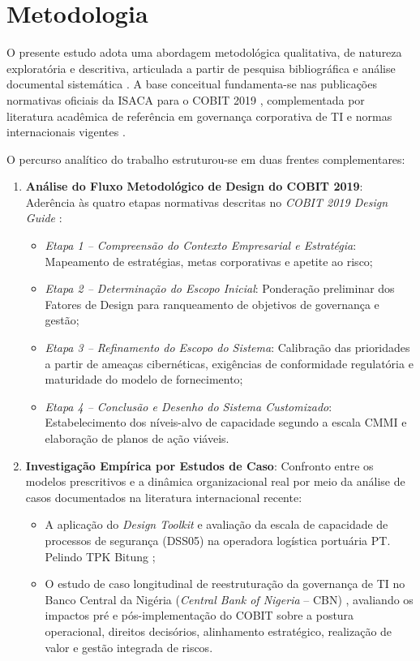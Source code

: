 \section{Metodologia}

O presente estudo adota uma abordagem metodológica qualitativa, de natureza exploratória e descritiva, articulada a partir de pesquisa bibliográfica e análise documental sistemática \cite{fernandes2014implantando}. A base conceitual fundamenta-se nas publicações normativas oficiais da ISACA para o COBIT 2019 \cite{isaca2019framework,isaca2019governance,isaca2019design}, complementada por literatura acadêmica de referência em governança corporativa de TI \cite{weill2004governance,feely2007getting} e normas internacionais vigentes \cite{iso2024iso38500}.

O percurso analítico do trabalho estruturou-se em duas frentes complementares:

\begin{enumerate}
    \item \textbf{Análise do Fluxo Metodológico de Design do COBIT 2019}: Aderência às quatro etapas normativas descritas no \textit{COBIT 2019 Design Guide} \cite{isaca2019design}:
    \begin{itemize}
        \item \textit{Etapa 1 -- Compreensão do Contexto Empresarial e Estratégia}: Mapeamento de estratégias, metas corporativas e apetite ao risco;
        \item \textit{Etapa 2 -- Determinação do Escopo Inicial}: Ponderação preliminar dos Fatores de Design para ranqueamento de objetivos de governança e gestão;
        \item \textit{Etapa 3 -- Refinamento do Escopo do Sistema}: Calibração das prioridades a partir de ameaças cibernéticas, exigências de conformidade regulatória e maturidade do modelo de fornecimento;
        \item \textit{Etapa 4 -- Conclusão e Desenho do Sistema Customizado}: Estabelecimento dos níveis-alvo de capacidade segundo a escala CMMI e elaboração de planos de ação viáveis.
    \end{itemize}
    \item \textbf{Investigação Empírica por Estudos de Caso}: Confronto entre os modelos prescritivos e a dinâmica organizacional real por meio da análise de casos documentados na literatura internacional recente:
    \begin{itemize}
        \item A aplicação do \textit{Design Toolkit} e avaliação da escala de capacidade de processos de segurança (DSS05) na operadora logística portuária PT. Pelindo TPK Bitung \cite{tangka2023information};
        \item O estudo de caso longitudinal de reestruturação da governança de TI no Banco Central da Nigéria (\textit{Central Bank of Nigeria} -- CBN) \cite{teitler2022case}, avaliando os impactos pré e pós-implementação do COBIT sobre a postura operacional, direitos decisórios, alinhamento estratégico, realização de valor e gestão integrada de riscos.
    \end{itemize}
\end{enumerate}
